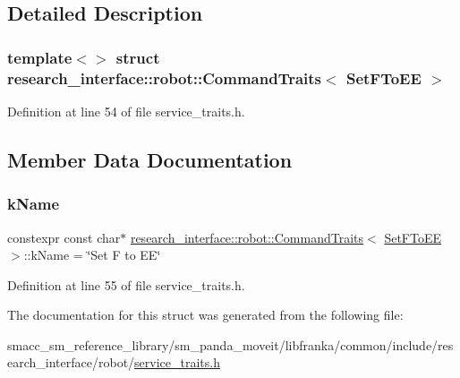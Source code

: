 \subsection{Detailed Description}
\subsubsection*{template$<$$>$\newline
struct research\+\_\+interface\+::robot\+::\+Command\+Traits$<$ Set\+F\+To\+E\+E $>$}



Definition at line 54 of file service\+\_\+traits.\+h.



\subsection{Member Data Documentation}
\mbox{\label{structresearch__interface_1_1robot_1_1CommandTraits_3_01SetFToEE_01_4_ae9ea2a226f16b3d50153aa7eacf2f1b4}} 
\subsubsection{\texorpdfstring{k\+Name}{kName}}
{\footnotesize\ttfamily constexpr const char$\ast$ \hyperlink{structresearch__interface_1_1robot_1_1CommandTraits}{research\+\_\+interface\+::robot\+::\+Command\+Traits}$<$ \hyperlink{structresearch__interface_1_1robot_1_1SetFToEE}{Set\+F\+To\+EE} $>$\+::k\+Name = \char`\"{}Set F to EE\char`\"{}\hspace{0.3cm}{\ttfamily [static]}}



Definition at line 55 of file service\+\_\+traits.\+h.



The documentation for this struct was generated from the following file\+:\begin{DoxyCompactItemize}
\item 
smacc\+\_\+sm\+\_\+reference\+\_\+library/sm\+\_\+panda\+\_\+moveit/libfranka/common/include/research\+\_\+interface/robot/\hyperlink{service__traits_8h}{service\+\_\+traits.\+h}\end{DoxyCompactItemize}
